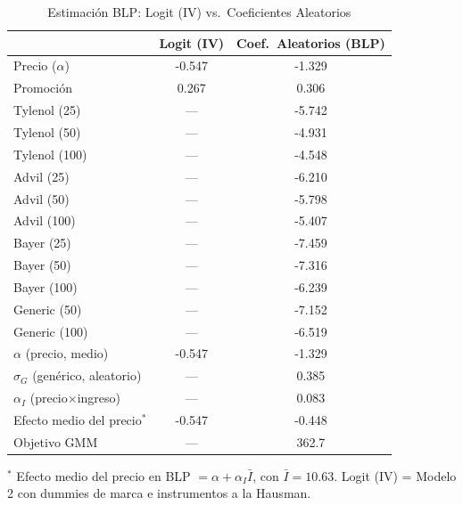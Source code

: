 \begin{table}[H]
\centering
\small
\caption{Estimaci\'on BLP: Logit (IV) vs.\ Coeficientes Aleatorios}
\begin{tabular}{lcc}
\toprule
& Logit (IV) & Coef.\ Aleatorios (BLP) \\
\midrule
Precio ($\alpha$) & -0.547 & -1.329 \\
Promoci\'on & 0.267 & 0.306 \\
Tylenol (25) & --- & -5.742 \\
Tylenol (50) & --- & -4.931 \\
Tylenol (100) & --- & -4.548 \\
Advil (25) & --- & -6.210 \\
Advil (50) & --- & -5.798 \\
Advil (100) & --- & -5.407 \\
Bayer (25) & --- & -7.459 \\
Bayer (50) & --- & -7.316 \\
Bayer (100) & --- & -6.239 \\
Generic (50) & --- & -7.152 \\
Generic (100) & --- & -6.519 \\
\midrule
$\alpha$ (precio, medio) & -0.547 & -1.329 \\
$\sigma_G$ (gen\'erico, aleatorio) & --- & 0.385 \\
$\alpha_I$ (precio$\times$ingreso) & --- & 0.083 \\
Efecto medio del precio$^{*}$ & -0.547 & -0.448 \\
Objetivo GMM & --- & 362.7 \\
\bottomrule
\end{tabular}

\smallskip
{\footnotesize\begin{minipage}{0.92\linewidth}$^{*}$ Efecto medio del precio en BLP $=\alpha+\alpha_I\bar{I}$, con $\bar{I}=10.63$. Logit (IV) = Modelo 2 con dummies de marca e instrumentos a la Hausman.\end{minipage}}
\end{table}
